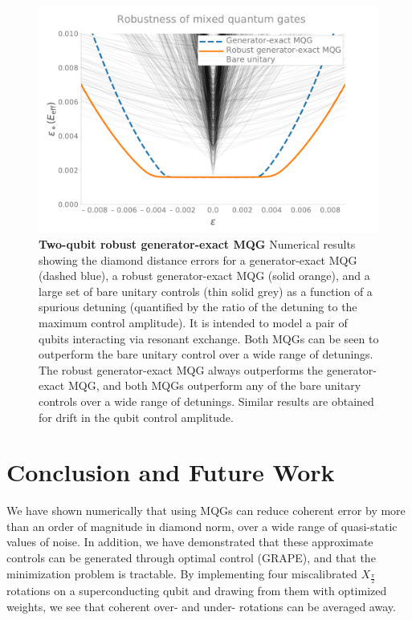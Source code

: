 \documentclass[aps,nofootinbib,pra,notitlepage,twocolumn]{revtex4-1}
\newcommand{\0}{\ensuremath{\mathbf{0}}}
\begin{document}
{\begin{figure}
  \centering
  \includegraphics[width=\columnwidth]{2q_robustness.pdf}
  \caption{\textbf{Two-qubit robust generator-exact MQG} Numerical results showing the diamond distance errors for a generator-exact MQG (dashed blue), a robust generator-exact MQG (solid orange), and a large set of bare unitary controls (thin solid grey) as a function of a spurious detuning (quantified by the ratio of the detuning to the maximum control amplitude). It is intended to model a pair of qubits interacting via resonant exchange. Both MQGs can be seen to outperform the bare unitary control over a wide range of detunings. The robust generator-exact  MQG always outperforms the generator-exact MQG, and both MQGs outperform any of the bare unitary controls over a wide range of detunings. Similar results are obtained for drift in the qubit control amplitude.}
  \label{fig:2MQG}
\end{figure}








\section{Conclusion and Future Work}
We have shown numerically that using MQGs can reduce coherent error by more than an order of magnitude in diamond norm, over a wide range of quasi-static values of noise. In addition, we have demonstrated that these approximate controls can be generated through optimal control (GRAPE), and that the minimization problem is tractable. By implementing four miscalibrated $X_{\frac{\pi}{2}}$ rotations on a superconducting qubit and drawing from them with optimized weights, we see that coherent over- and under- rotations can be averaged away.

}
\end{document}
